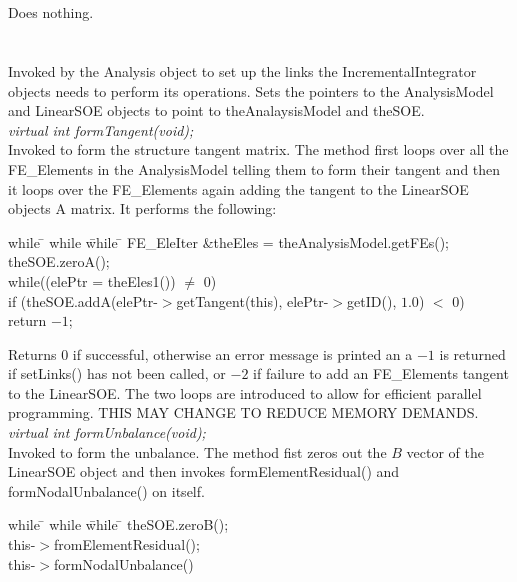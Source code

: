  \\
\\ 
Does nothing. \\

\\
 \\  
Invoked by the Analysis object to set up the links the
IncrementalIntegrator objects needs to perform its operations.
Sets the pointers to the AnalysisModel and LinearSOE objects to point
to \p theAnalaysisModel and \p theSOE. \\

{\em virtual int formTangent(void);} \\
Invoked to form the structure tangent matrix. The method first loops
over all the FE\_Elements in the AnalysisModel telling them to form
their tangent and then it loops over the FE\_Elements again adding the
tangent to the LinearSOE objects A matrix. It performs the following:
\begin{tabbing}
while \= \+ while \= while \= \kill
FE\_EleIter \&theEles = theAnalysisModel.getFEs();\\
theSOE.zeroA();\\
while((elePtr = theEles1()) $\neq$ 0) \+ \\
if (theSOE.addA(elePtr-$>$getTangent(this),
elePtr-$>$getID(), $1.0$) $<$ 0) \+ \\
return $-1$; \-\- 
\end{tabbing}
\noindent Returns $0$ if successful, otherwise an error
message is printed an a $-1$ is returned if setLinks() has not
been called, or $-2$ if failure to add an FE\_Elements tangent to the
LinearSOE. The two loops are introduced to allow for efficient
parallel programming. THIS MAY CHANGE TO REDUCE MEMORY DEMANDS.\\  

{\em virtual int formUnbalance(void);} \\
Invoked to form the unbalance. The method fist zeros out the $B$
vector of the LinearSOE object and then invokes formElementResidual()
and formNodalUnbalance() on itself. \\
\begin{tabbing}
while \= \+ while \= while \= \kill
theSOE.zeroB();\\
this-$>$fromElementResidual(); \\
this-$>$formNodalUnbalance() \\
\end{tabbing}

